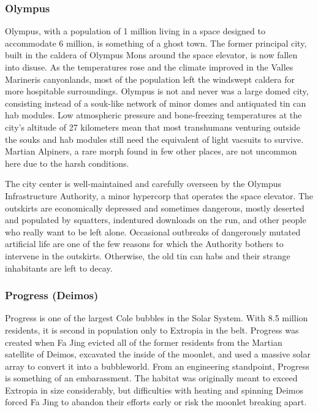 \subsubsection{Olympus}


Olympus, with a population of 1 million living 
in a space designed to accommodate 6 million, is 
something of a ghost town. The former principal 
city, built in the caldera of Olympus Mons around 
the space elevator, is now fallen into disuse. As the 
temperatures rose and the climate improved in the 
Valles Marineris canyonlands, most of the population left the windswept caldera for more hospitable 
surroundings. Olympus is not and never was a large 
domed city, consisting instead of a souk-like network 
of minor domes and antiquated tin can hab modules. 
Low atmospheric pressure and bone-freezing temperatures at the city's altitude of 27 kilometers mean 
that most transhumans venturing outside the souks 
and hab modules still need the equivalent of light 
vacsuits to survive. Martian Alpiners, a rare morph 
found in few other places, are not uncommon here 
due to the harsh conditions.

The city center is well-maintained and carefully 
overseen by the Olympus Infrastructure Authority, 
a minor hypercorp that operates the space elevator. 
The outskirts are economically depressed and sometimes dangerous, mostly deserted and populated by 
squatters, indentured downloads on the run, and 
other people who really want to be left alone. Occasional outbreaks of dangerously mutated artificial 
life are one of the few reasons for which the Authority bothers to intervene in the outskirts. Otherwise, 
the old tin can habs and their strange inhabitants are 
left to decay.

\subsubsection{Progress (Deimos)}

Progress is one of the largest Cole bubbles in the Solar 
System. With 8.5 million residents, it is second in 
population only to Extropia in the belt. Progress was 
created when Fa Jing evicted all of the former residents 
from the Martian satellite of Deimos, excavated the 
inside of the moonlet, and used a massive solar array 
to convert it into a bubbleworld. From an engineering 
standpoint, Progress is something of an embarassment. 
The habitat was originally meant to exceed Extropia 
in size considerably, but difficulties with heating and 
spinning Deimos forced Fa Jing to abandon their efforts early or risk the moonlet breaking apart.

